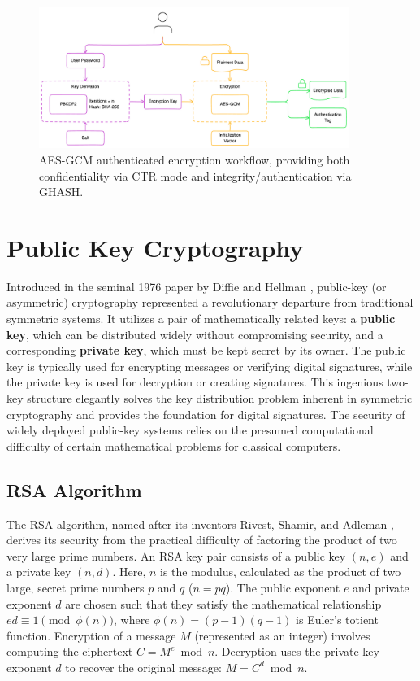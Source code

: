 \begin{figure}[ht]
    \centering
    \includegraphics[width=0.9\textwidth]{03_Classical_Cryptography/aes_gcm_workflow}
    \caption{AES-GCM authenticated encryption workflow, providing both confidentiality via CTR mode and integrity/authentication via GHASH.}
    \label{fig:aes_gcm_ch3}
\end{figure}

\section{Public Key Cryptography}\label{sec:public_key_ch3}

Introduced in the seminal 1976 paper by Diffie and Hellman \parencite{diffie1976new}, public-key (or asymmetric) cryptography represented a revolutionary departure from traditional symmetric systems. It utilizes a pair of mathematically related keys: a \textbf{public key}, which can be distributed widely without compromising security, and a corresponding \textbf{private key}, which must be kept secret by its owner. The public key is typically used for encrypting messages or verifying digital signatures, while the private key is used for decryption or creating signatures. This ingenious two-key structure elegantly solves the key distribution problem inherent in symmetric cryptography and provides the foundation for digital signatures. The security of widely deployed public-key systems relies on the presumed computational difficulty of certain mathematical problems for classical computers.

\subsection{RSA Algorithm}\label{subsec:rsa_ch3}
The RSA algorithm, named after its inventors Rivest, Shamir, and Adleman \parencite{rivest1978method}, derives its security from the practical difficulty of factoring the product of two very large prime numbers. An RSA key pair consists of a public key $(n, e)$ and a private key $(n, d)$. Here, $n$ is the modulus, calculated as the product of two large, secret prime numbers $p$ and $q$ ($n=pq$). The public exponent $e$ and private exponent $d$ are chosen such that they satisfy the mathematical relationship $ed \equiv 1 \pmod{\phi(n)}$, where $\phi(n) = (p-1)(q-1)$ is Euler's totient function. Encryption of a message $M$ (represented as an integer) involves computing the ciphertext $C = M^e \bmod n$. Decryption uses the private key exponent $d$ to recover the original message: $M = C^d \bmod n$.

